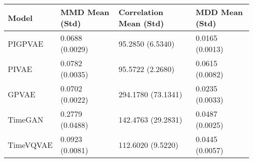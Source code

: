 \begin{tabular}{llll}
\toprule
Model & MMD Mean (Std) & Correlation Mean (Std) & MDD Mean (Std) \\
\midrule
PIGPVAE & 0.0688 (0.0029) & 95.2850 (6.5340) & 0.0165 (0.0013) \\
PIVAE & 0.0782 (0.0035) & 95.5722 (2.2680) & 0.0615 (0.0082) \\
GPVAE & 0.0702 (0.0022) & 294.1780 (73.1341) & 0.0235 (0.0033) \\
TimeGAN & 0.2779 (0.0488) & 142.4763 (29.2831) & 0.0487 (0.0025) \\
TimeVQVAE & 0.0923 (0.0081) & 112.6020 (9.5220) & 0.0445 (0.0057) \\
\bottomrule
\end{tabular}
